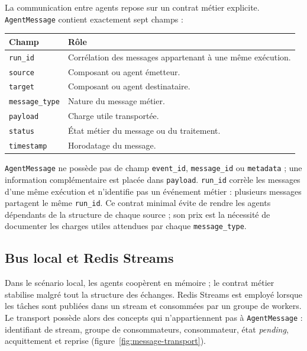 La communication entre agents repose sur un contrat métier explicite. \texttt{AgentMessage} contient exactement sept champs :
\begin{center}
\small
\begin{tabular}{ll}
\toprule
\textbf{Champ} & \textbf{Rôle} \\
\midrule
\texttt{run\_id} & Corrélation des messages appartenant à une même exécution. \\
\texttt{source} & Composant ou agent émetteur. \\
\texttt{target} & Composant ou agent destinataire. \\
\texttt{message\_type} & Nature du message métier. \\
\texttt{payload} & Charge utile transportée. \\
\texttt{status} & État métier du message ou du traitement. \\
\texttt{timestamp} & Horodatage du message. \\
\bottomrule
\end{tabular}
\end{center}
\texttt{AgentMessage} ne possède pas de champ \texttt{event\_id}, \texttt{message\_id} ou \texttt{metadata} ; une information complémentaire est placée dans \texttt{payload}. \texttt{run\_id} corrèle les messages d'une même exécution et n'identifie pas un événement métier : plusieurs messages partagent le même \texttt{run\_id}. Ce contrat minimal évite de rendre les agents dépendants de la structure de chaque source ; son prix est la nécessité de documenter les charges utiles attendues par chaque \texttt{message\_type}.

\subsection{Bus local et Redis Streams}

Dans le scénario local, les agents coopèrent en mémoire ; le contrat métier stabilise malgré tout la structure des échanges. Redis Streams est employé lorsque les tâches sont publiées dans un stream et consommées par un groupe de workers. Le transport possède alors des concepts qui n'appartiennent pas à \texttt{AgentMessage} : identifiant de stream, groupe de consommateurs, consommateur, état \textit{pending}, acquittement et reprise (figure~\ref{fig:message-transport}).

